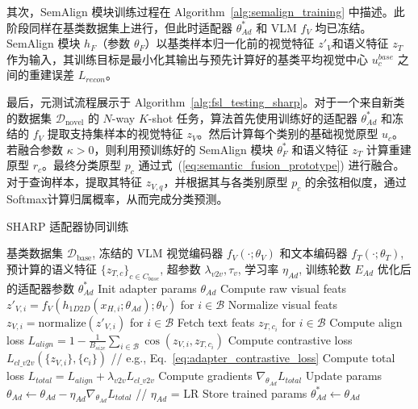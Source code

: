 其次，SemAlign 模块训练过程在 Algorithm~\ref{alg:semalign_training} 中描述。此阶段同样在基类数据集上进行，但此时适配器 $\theta_{Ad}^*$ 和 VLM $f_V$ 均已冻结。SemAlign 模块 $h_F$（参数 $\theta_F$）以基类样本归一化前的视觉特征 $z'_V$和语义特征 $z_T$ 作为输入，其训练目标是最小化其输出与预先计算好的基类平均视觉中心 $u_c^{base}$ 之间的重建误差 $L_{recon}$。

最后，元测试流程展示于 Algorithm~\ref{alg:fsl_testing_sharp}。对于一个来自新类的数据集 $\mathcal{D}_{\text{novel}}$ 的 $N$-way $K$-shot 任务，算法首先使用训练好的适配器 $\theta_{Ad}^*$ 和冻结的 $f_V$ 提取支持集样本的视觉特征 $z_V$。然后计算每个类别的基础视觉原型 $u_c$。若融合参数 $\kappa > 0$，则利用预训练好的 SemAlign 模块 $\theta_F^*$ 和语义特征 $z_T$ 计算重建原型 $r_c$。最终分类原型 $p_c$ 通过式~(\ref{eq:semantic_fusion_prototype}) 进行融合。对于查询样本，提取其特征 $z_{V,q}$，并根据其与各类别原型 $p_c$ 的余弦相似度，通过 Softmax计算归属概率，从而完成分类预测。 

\begin{algorithm}[htbp] 
\caption{SHARP 适配器协同训练} \label{alg:adapter_training_synergistic} 
\begin{algorithmic}[1] 
\REQUIRE 基类数据集 $\mathcal{D}_{\text{base}}$, 冻结的 VLM 视觉编码器 $f_V(\cdot; \theta_V)$ 和文本编码器 $f_T(\cdot; \theta_T)$, 预计算的语义特征 $\{z_{T,c}\}_{c \in C_{base}}$, 超参数 $\lambda_{v2v}, \tau_v$, 学习率 $\eta_{Ad}$, 训练轮数 $E_{Ad}$ \ENSURE 优化后的适配器参数 $\theta_{Ad}^*$
\STATE Init adapter params $\theta_{Ad}$
        \STATE Compute raw visual feats $z'_{V,i} = f_V(h_{1D2D}(x_{H,i}; \theta_{Ad}); \theta_V)$ for $i \in \mathcal{B}$
        \STATE Normalize visual feats $z_{V,i} = \text{normalize}(z'_{V,i})$ for $i \in \mathcal{B}$
        \STATE Fetch text feats $z_{T,c_i}$ for $i \in \mathcal{B}$
        \STATE Compute align loss $L_{align} = 1 - \frac{1}{B_{size}} \sum_{i \in \mathcal{B}} \cos(z_{V,i}, z_{T,c_i})$
        \STATE Compute contrastive loss $L_{cl\_v2v}(\{z_{V,i}\}, \{c_i\})$ // e.g., Eq.~\ref{eq:adapter_contrastive_loss}
        \STATE Compute total loss $L_{total} = L_{align} + \lambda_{v2v} L_{cl\_v2v}$
        \STATE Compute gradients $\nabla_{\theta_{Ad}} L_{total}$
        \STATE Update params $\theta_{Ad} \leftarrow \theta_{Ad} - \eta_{Ad} \nabla_{\theta_{Ad}} L_{total}$ // $\eta_{Ad}$ = LR
    \ENDFOR
\ENDFOR
\STATE Store trained params $\theta_{Ad}^* \leftarrow \theta_{Ad}$
\end{algorithmic} 
\end{algorithm} 

